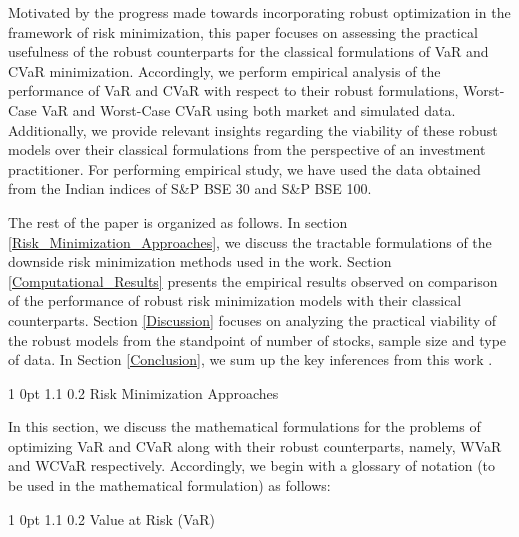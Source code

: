 \documentclass[12pt]{article}
\makeatletter
\numberwithin{equation}{section}
\renewcommand{\section}{
  \@startsection
  {section}%
  {1}%
  {0pt}%
  {1.1\baselineskip}%
  {0.2\baselineskip}%
  {\sc \centering}%
}
\renewcommand{\subsection}{
  \@startsection
  {subsection}%
  {1}%
  {0pt}%
  {1.1\baselineskip}%
  {0.2\baselineskip}%
  {\sc \centering}%
}
\makeatother
\begin{document}
Motivated by the progress made towards incorporating robust optimization in the framework of risk minimization, this paper focuses on assessing the practical usefulness of the robust counterparts for the classical formulations of VaR and CVaR minimization. Accordingly, we perform empirical analysis of the performance of VaR and CVaR with respect to their robust formulations, Worst-Case VaR and Worst-Case CVaR using both market and simulated data. Additionally, we provide relevant insights regarding the viability of these robust models over their classical formulations from the perspective of an investment practitioner. For performing empirical study, we have used the data obtained from the Indian indices of S\&P BSE 30 and S\&P BSE 100.

The rest of the paper is organized as follows. In section \ref{Risk_Minimization_Approaches}, we discuss the tractable formulations of the downside risk minimization methods used in the work. Section \ref{Computational_Results} presents the empirical results observed on comparison of the performance of robust risk minimization models with their classical counterparts. Section \ref{Discussion} focuses on analyzing the practical viability of the robust models from the standpoint of number of stocks, sample size and type of data. In Section \ref{Conclusion}, we sum up the key inferences from this work .

\section{Risk Minimization Approaches}
\label{Risk_Minimization_Approaches}

In this section, we discuss the mathematical formulations for the problems of optimizing VaR and CVaR along with their robust counterparts, namely, WVaR and WCVaR respectively. Accordingly, we begin with a glossary of notation (to be used in the mathematical formulation) as follows:

\subsection{Value at Risk (VaR)}
\end{document}
